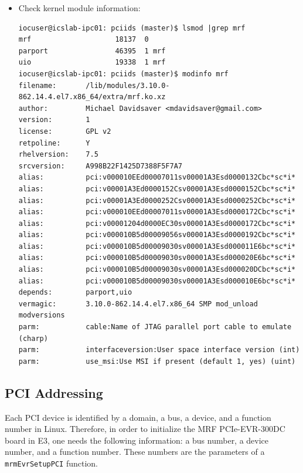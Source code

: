 \documentclass[11pt
  , a4paper
  , article
  , oneside
  , showtrims
]{memoir}
\begin{document}
{\begin{itemize}
\begin{lstlisting}[style=termstyle]
It is OK to see "E3/RULES_DKMS:37: recipe for target 'setup' failed"
---------------------------------------------------------------------
crw-rw-rw-. 1 root root 241, 0 Dec 13 10:11 /dev/uio0
crw-rw-rw-. 1 root root 241, 1 Dec 13 10:11 /dev/uio1
---------------------------------------------------------------------
\end{lstlisting}
\item Check kernel module information:
\begin{lstlisting}[style=termstyle]
iocuser@icslab-ipc01: pciids (master)$ lsmod |grep mrf
mrf                    18137  0
parport                46395  1 mrf
uio                    19338  1 mrf
iocuser@icslab-ipc01: pciids (master)$ modinfo mrf
filename:       /lib/modules/3.10.0-862.14.4.el7.x86_64/extra/mrf.ko.xz
author:         Michael Davidsaver <mdavidsaver@gmail.com>
version:        1
license:        GPL v2
retpoline:      Y
rhelversion:    7.5
srcversion:     A998B22F1425D7388F5F7A7
alias:          pci:v000010EEd00007011sv00001A3Esd0000132Cbc*sc*i*
alias:          pci:v00001A3Ed0000152Csv00001A3Esd0000152Cbc*sc*i*
alias:          pci:v00001A3Ed0000252Csv00001A3Esd0000252Cbc*sc*i*
alias:          pci:v000010EEd00007011sv00001A3Esd0000172Cbc*sc*i*
alias:          pci:v00001204d0000EC30sv00001A3Esd0000172Cbc*sc*i*
alias:          pci:v000010B5d00009056sv00001A3Esd0000192Cbc*sc*i*
alias:          pci:v000010B5d00009030sv00001A3Esd000011E6bc*sc*i*
alias:          pci:v000010B5d00009030sv00001A3Esd000020E6bc*sc*i*
alias:          pci:v000010B5d00009030sv00001A3Esd000020DCbc*sc*i*
alias:          pci:v000010B5d00009030sv00001A3Esd000010E6bc*sc*i*
depends:        parport,uio
vermagic:       3.10.0-862.14.4.el7.x86_64 SMP mod_unload modversions
parm:           cable:Name of JTAG parallel port cable to emulate (charp)
parm:           interfaceversion:User space interface version (int)
parm:           use_msi:Use MSI if present (default 1, yes) (uint)
\end{lstlisting}
\end{itemize}

\subsection{PCI Addressing}
Each PCI device is identified by a domain, a bus, a device, and a function number in Linux. Therefore, in order to initialize the MRF PCIe-EVR-300DC board in E3, one needs the following information: a bus number, a device number, and a function number. These numbers are the parameters of a \texttt{mrmEvrSetupPCI} function.

}
\end{document}
